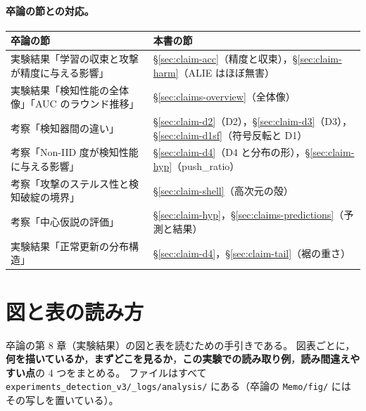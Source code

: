 \documentclass[a4j, dvipdfmx]{jsarticle}  %
\begin{document}
\paragraph{卒論の節との対応。}
\begin{table}[H]
\centering
\begin{tabular}{@{}P{6.6cm} P{8.7cm}@{}}
\toprule
卒論の節 & 本書の節 \\
\midrule
実験結果「学習の収束と攻撃が精度に与える影響」 & \S\ref{sec:claim-acc}（精度と収束），\S\ref{sec:claim-harm}（ALIE はほぼ無害） \\
実験結果「検知性能の全体像」「AUC のラウンド推移」 & \S\ref{sec:claims-overview}（全体像） \\
考察「検知器間の違い」 & \S\ref{sec:claim-d2}（D2），\S\ref{sec:claim-d3}（D3），\S\ref{sec:claim-d1sf}（符号反転と D1） \\
考察「Non-IID 度が検知性能に与える影響」 & \S\ref{sec:claim-d4}（D4 と分布の形），\S\ref{sec:claim-hyp}（push\_ratio） \\
考察「攻撃のステルス性と検知破綻の境界」 & \S\ref{sec:claim-shell}（高次元の殻） \\
考察「中心仮説の評価」 & \S\ref{sec:claim-hyp}，\S\ref{sec:claims-predictions}（予測と結果） \\
実験結果「正常更新の分布構造」 & \S\ref{sec:claim-d4}，\S\ref{sec:claim-tail}（裾の重さ） \\
\bottomrule
\end{tabular}
\end{table}

\section{図と表の読み方}
\label{sec:claims-reading}

卒論の第 8 章（実験結果）の図と表を読むための手引きである。
図表ごとに，\textbf{何を描いているか}，\textbf{まずどこを見るか}，\textbf{この実験での読み取り例}，\textbf{読み間違えやすい点}の 4 つをまとめる。
ファイルはすべて \texttt{experiments\_detection\_v3/\_logs/analysis/} にある（卒論の \texttt{Memo/fig/} にはその写しを置いている）。
\end{document}
